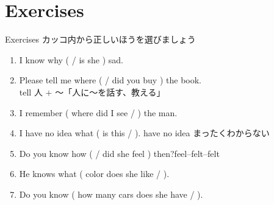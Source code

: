 \documentclass[aspectratio=169,xcolor={dvipsnames,table}]{beamer}
\begin{document}
\section{Exercises}
\begin{frame}[plain]{Exercises}
カッコ内から正しいほうを選びましょう%
\mbox{}\hfill{\scriptsize {}}

 \begin{enumerate}
  \item I know why (  / is she ) sad.
  \item Please tell me where (  / did you buy ) the book.\\%
\hfill{\scriptsize tell 人 $+$ ～「人に～を話す、教える」}
  \item I remember ( where did I see /  ) the man.
  \item I have no idea what ( is this /  ).%
\hfill{\scriptsize have no idea まったくわからない}
  \item Do you know how (  / did she feel ) then?\hfill{\scriptsize feel--felt--felt}
  \item He knows what ( color does she like /  ).
 \item Do you know ( how many cars does she have / ).
 \end{enumerate}
\end{frame}
\end{document}
